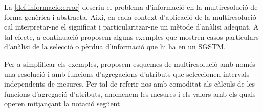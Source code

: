 La \autoref{def:informacio:error} descriu el problema d'informació en
la multiresolució de forma genèrica i abstracta. Així, en cada context
d'aplicació de la multiresolució cal interpretar-ne el significat i
particularitzar-ne un mètode d'anàlisi adequat.  A tal efecte, a
continuació proposem alguns exemples que mostren casos particulars
d'anàlisi de la selecció o pèrdua d'informació que hi ha en un
\gls{SGSTM}.


Per a simplificar els exemples, proposem esquemes de multiresolució amb
només una resolució i amb funcions d'agregacions d'atributs que
seleccionen intervals independents de mesures. Per tal de referir-nos
amb comoditat als càlculs de les funcions d'agregació d'atributs,
anomenem les mesures i els valors amb els quals operen mitjançant la
notació següent.



